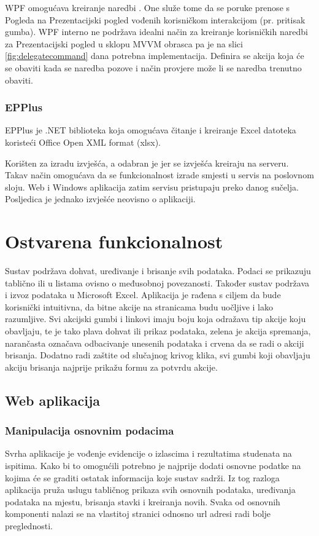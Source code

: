 \documentclass[times, utf8, diplomski]{fer}
\begin{document}
WPF omogućava kreiranje naredbi . One služe tome da se poruke prenose s Pogleda na Prezentacijski pogled vođenih korisničkom interakcijom (pr. pritisak gumba). WPF interno ne podržava idealni način za kreiranje korisničkih naredbi za Prezentacijski pogled u sklopu MVVM obrasca pa je na slici \ref{fig:delegatecommand} dana potrebna implementacija. Definira se akcija koja će se obaviti kada se naredba pozove i način provjere može li se naredba trenutno obaviti.

\subsection{EPPlus}
EPPlus je .NET biblioteka koja omogućava čitanje i kreiranje Excel datoteka koristeći Office Open XML format (xlsx). 

Korišten za izradu izvješća, a odabran je jer se izvješća kreiraju na serveru. Takav način omogućava da se funkcionalnost izrade smjesti u servis na poslovnom sloju. Web i Windows aplikacija zatim servisu pristupaju preko danog sučelja. Posljedica je jednako izvješće neovisno o aplikaciji.

\chapter{Ostvarena funkcionalnost}

Sustav podržava dohvat, uređivanje i brisanje svih podataka. Podaci se prikazuju tablično ili u listama ovisno o međusobnoj povezanosti. Također sustav podržava i izvoz podataka u Microsoft Excel. Aplikacija je rađena s ciljem da bude korisnički intuitivna, da bitne akcije na stranicama budu uočljive i lako razumljive. Svi akcijski gumbi i linkovi imaju boju koja odražava tip akcije koju obavljaju, te je tako plava dohvat ili prikaz podataka, zelena je akcija spremanja, narančasta označava odbacivanje unesenih podataka i crvena da se radi o akciji brisanja. Dodatno radi zaštite od slučajnog krivog klika, svi gumbi koji obavljaju akciju brisanja najprije prikažu formu za potvrdu akcije. 

\section{Web aplikacija}

\subsection{Manipulacija osnovnim podacima}
Svrha aplikacije je vođenje evidencije o izlascima i rezultatima studenata na ispitima. Kako bi to omogućili potrebno je najprije dodati osnovne podatke na kojima će se graditi ostatak informacija koje sustav sadrži.
Iz tog razloga aplikacija pruža uslugu tabličnog prikaza svih osnovnih podataka, uređivanja podataka na mjestu, brisanja stavki i kreiranja novih. Svaka od osnovnih komponenti nalazi se na vlastitoj stranici odnosno url adresi radi bolje preglednosti. 
\end{document}
